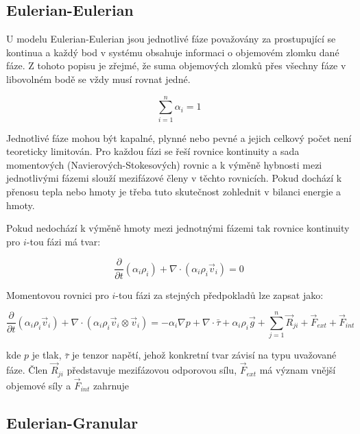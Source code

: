 \subsection{Eulerian-Eulerian}
U modelu Eulerian-Eulerian jsou jednotlivé fáze považovány za prostupující se kontinua a každý bod v systému obsahuje informaci o objemovém zlomku dané fáze. Z tohoto popisu je zřejmé, že suma objemových zlomků přes všechny fáze v libovolném bodě se vždy musí rovnat jedné. 

\begin{equation}
	\sum_{i=1}^n \alpha_{i} = 1
	\label{eq:volfrac}
\end{equation} 

\noindent Jednotlivé fáze mohou být kapalné, plynné nebo pevné a jejich celkový počet není teoreticky limitován. Pro každou fázi se řeší rovnice kontinuity a sada momentových (Navierových-Stokesových) rovnic a k výměně hybnosti mezi jednotlivými fázemi slouží mezifázové členy v těchto rovnicích. Pokud dochází k přenosu tepla nebo hmoty je třeba tuto skutečnost zohlednit v bilanci energie a hmoty.    

Pokud nedochází k výměně hmoty mezi jednotnými fázemi tak rovnice kontinuity pro $i$-tou fázi má tvar:

\begin{equation}
	\frac{\partial}{\partial t} (\alpha_{i}\rho_{i}) +  \nabla \cdot (\alpha_{i}\rho_{i}\vec{v}_{i}) = 0
	\label{eq:conti}
\end{equation}

\noindent Momentovou rovnici pro $i$-tou fázi za stejných předpokladů lze zapsat jako:

\begin{equation}
	\frac{\partial}{\partial t} (\alpha_{i}\rho_{i}\vec{v}_{i}) + \nabla \cdot (\alpha_{i}\rho_{i} \vec{v}_{i} \otimes \vec{v}_{i}) = -\alpha_{i} \nabla p + \nabla \cdot \bar{\tau} + \alpha_{i}\rho_{i}\vec{g} + \sum_{j=1}^n \vec{R}_{ji} + \vec{F}_{ext} + \vec{F}_{int}
	\label{eq:conti}
\end{equation}

\noindent kde $p$ je tlak, $\bar{\tau}$ je tenzor napětí, jehož konkretní tvar závisí na typu uvažované fáze. Člen $\vec{R}_{ji}$ představuje mezifázovou odporovou sílu, $\vec{F}_{ext}$ má význam vnější objemové síly a $\vec{F}_{int}$ zahrnuje 

\subsection{Eulerian-Granular}

